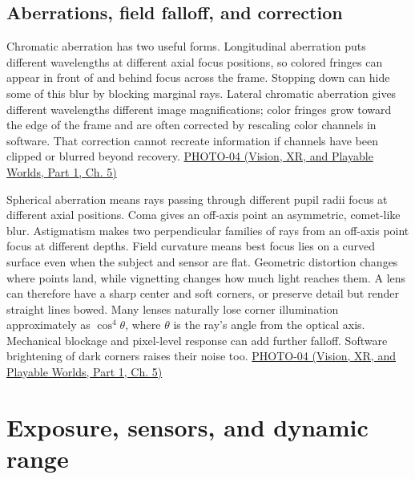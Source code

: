 \subsection{Aberrations, field falloff, and correction}\label{03-visual-computing-i-ch003-aberrations-field-falloff-and-correction}

\hypertarget{03-visual-computing-i-ch003-aberrations-field-falloff-and-correction}{}

Chromatic aberration has two useful forms. Longitudinal aberration puts different wavelengths at different axial focus positions, so colored fringes can appear in front of and behind focus across the frame. Stopping down can hide some of this blur by blocking marginal rays. Lateral chromatic aberration gives different wavelengths different image magnifications; color fringes grow toward the edge of the frame and are often corrected by rescaling color channels in software. That correction cannot recreate information if channels have been clipped or blurred beyond recovery. \href{../07-Vision-XR-and-Playable-Worlds-P01/main.pdf\#nameddest=04-visual-computing-ii-ch036-photo-04---photography-session-04}{PHOTO-04 (Vision, XR, and Playable Worlds, Part 1, Ch. 5)}

Spherical aberration means rays passing through different pupil radii focus at different axial positions. Coma gives an off-axis point an asymmetric, comet-like blur. Astigmatism makes two perpendicular families of rays from an off-axis point focus at different depths. Field curvature means best focus lies on a curved surface even when the subject and sensor are flat. Geometric distortion changes where points land, while vignetting changes how much light reaches them. A lens can therefore have a sharp center and soft corners, or preserve detail but render straight lines bowed. Many lenses naturally lose corner illumination approximately as \(\cos^4\theta\), where \(\theta\) is the ray's angle from the optical axis. Mechanical blockage and pixel-level response can add further falloff. Software brightening of dark corners raises their noise too. \href{../07-Vision-XR-and-Playable-Worlds-P01/main.pdf\#nameddest=04-visual-computing-ii-ch036-photo-04---photography-session-04}{PHOTO-04 (Vision, XR, and Playable Worlds, Part 1, Ch. 5)}

\section{Exposure, sensors, and dynamic range}\label{03-visual-computing-i-ch003-exposure-sensors-and-dynamic-range}

